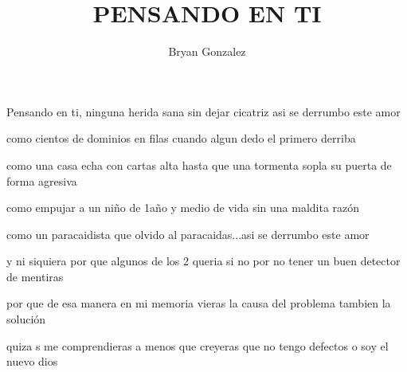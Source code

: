 \documentclass[english]{article}
\begin{document}
\title{PENSANDO EN TI}


\author{Bryan Gonzalez}

\maketitle
\begin{center}
Pensando en ti, ninguna herida sana sin dejar cicatriz
asi se derrumbo este amor
\par\end{center}

\begin{center}
como cientos de dominios en filas cuando algun dedo el
primero derriba 
\par\end{center}

\begin{center}
como una casa echa con cartas alta hasta que una tormenta
sopla su puerta de forma agresiva 
\par\end{center}

\begin{center}
como empujar a un niño de 1año y medio de vida sin una
maldita razón
\par\end{center}

\begin{center}
como un paracaidista que olvido al paracaidas...asi se
derrumbo este amor 
\par\end{center}

\begin{center}
y ni siquiera por que algunos de los 2 queria
si no por no tener un buen detector de mentiras
\par\end{center}

\begin{center}
por que de esa manera en mi memoria vieras
la causa del problema tambien la solución 
\par\end{center}

\begin{center}
quiza
s me comprendieras a menos que creyeras que no tengo
defectos o soy el nuevo dios 
\par\end{center}
\end{document}
